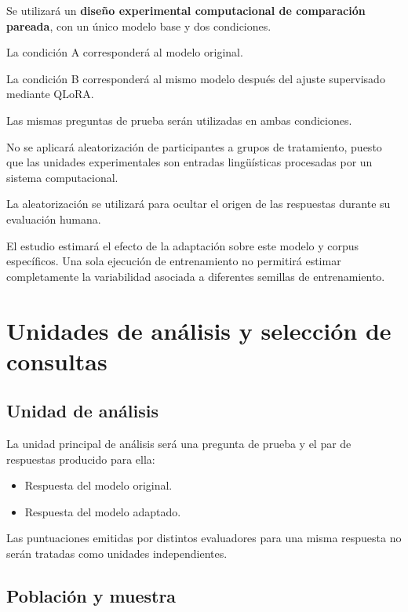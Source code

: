Se utilizará un \textbf{diseño experimental computacional de comparación pareada}, con un único modelo base y dos condiciones.

La condición A corresponderá al modelo original.

La condición B corresponderá al mismo modelo después del ajuste supervisado mediante QLoRA.

Las mismas preguntas de prueba serán utilizadas en ambas condiciones.

No se aplicará aleatorización de participantes a grupos de tratamiento, puesto que las unidades experimentales son entradas lingüísticas procesadas por un sistema computacional.

La aleatorización se utilizará para ocultar el origen de las respuestas durante su evaluación humana.

El estudio estimará el efecto de la adaptación sobre este modelo y corpus específicos. Una sola ejecución de entrenamiento no permitirá estimar completamente la variabilidad asociada a diferentes semillas de entrenamiento.



\section{Unidades de análisis y selección de consultas}\label{unidades-analisis-seleccion-consultas}

\subsection{Unidad de análisis}\label{unidad-de-anuxe1lisis}

La unidad principal de análisis será una pregunta de prueba y el par de respuestas producido para ella:

\begin{itemize}
\tightlist
\item
  Respuesta del modelo original.
\item
  Respuesta del modelo adaptado.
\end{itemize}

Las puntuaciones emitidas por distintos evaluadores para una misma respuesta no serán tratadas como unidades independientes.

\subsection{Población y muestra}\label{poblaciuxf3n-y-muestra}

